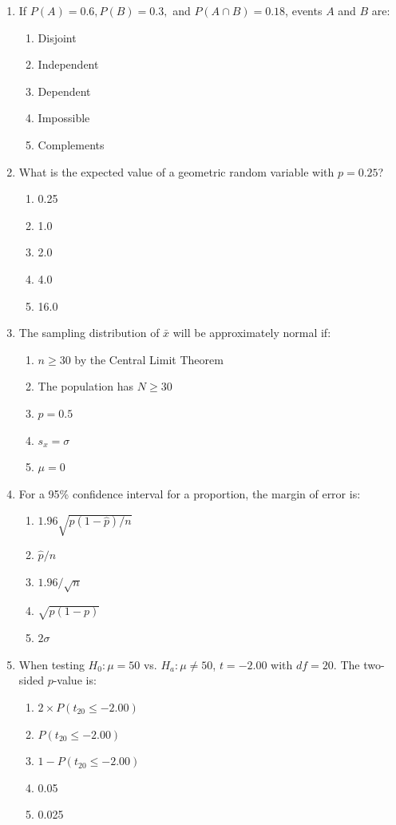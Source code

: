 \begin{enumerate}[leftmargin=1.5em]
  \item If $P(A) = 0.6, P(B) = 0.3,$ and $P(A \cap B) = 0.18$, events $A$ and $B$ are:
  \begin{enumerate}[label=(\Alph*)]
    \item Disjoint \item Independent \item Dependent \item Impossible \item Complements
  \end{enumerate}

  \item What is the expected value of a geometric random variable with $p = 0.25$?
  \begin{enumerate}[label=(\Alph*)]
    \item 0.25 \item 1.0 \item 2.0 \item 4.0 \item 16.0
  \end{enumerate}

  \item The sampling distribution of $\bar{x}$ will be approximately normal if:
  \begin{enumerate}[label=(\Alph*)]
    \item $n \ge 30$ by the Central Limit Theorem \item The population has $N \ge 30$ \item $p = 0.5$ \item $s_x = \sigma$ \item $\mu = 0$
  \end{enumerate}

  \item For a 95\% confidence interval for a proportion, the margin of error is:
  \begin{enumerate}[label=(\Alph*)]
    \item $1.96 \sqrt{\hat{p}(1-\hat{p})/n}$ \item $\hat{p} / n$ \item $1.96 / \sqrt{n}$ \item $\sqrt{p(1-p)}$ \item $2\sigma$
  \end{enumerate}

  \item When testing $H_0: \mu = 50$ vs. $H_a: \mu \neq 50$, $t = -2.00$ with $df = 20$. The two-sided $p$-value is:
  \begin{enumerate}[label=(\Alph*)]
    \item $2 \times P(t_{20} \le -2.00)$ \item $P(t_{20} \le -2.00)$ \item $1 - P(t_{20} \le -2.00)$ \item 0.05 \item 0.025
  \end{enumerate}


\end{enumerate}
